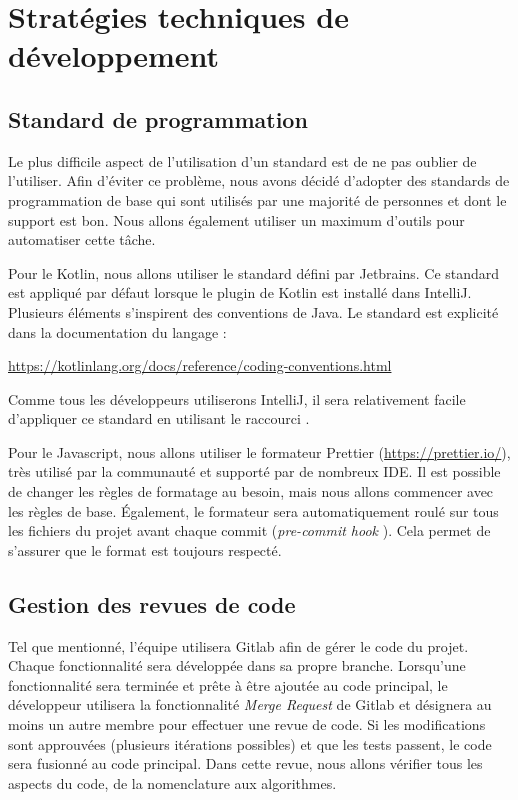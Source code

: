 \section{Stratégies techniques de développement}
	\subsection{Standard de programmation}
	Le plus difficile aspect de l’utilisation d’un standard est de ne pas oublier de l’utiliser. Afin d’éviter ce problème, nous avons décidé d’adopter des standards de programmation de base qui sont utilisés par une majorité de personnes et dont le support est bon. Nous allons également utiliser un maximum d’outils pour automatiser cette tâche.

	Pour le Kotlin, nous allons utiliser le standard défini par Jetbrains. Ce standard est appliqué par défaut lorsque le plugin de Kotlin est installé dans IntelliJ. Plusieurs éléments s’inspirent des conventions de Java. Le standard est explicité dans la documentation du langage :
	
	{\centering
	\url{https://kotlinlang.org/docs/reference/coding-conventions.html}
	\par}
	\noindent Comme tous les développeurs utiliserons IntelliJ, il sera relativement facile d’appliquer ce standard en utilisant le raccourci .

	Pour le Javascript, nous allons utiliser le formateur Prettier (\url{https://prettier.io/}), très utilisé par la communauté et supporté par de nombreux IDE. Il est possible de changer les règles de formatage au besoin, mais nous allons commencer avec les règles de base. Également, le formateur sera automatiquement roulé sur tous les fichiers du projet avant chaque commit (\og \emph{pre-commit hook} \fg{}). Cela permet de s’assurer que le format est toujours respecté. 
	\subsection{Gestion des revues de code}
	Tel que mentionné, l’équipe utilisera Gitlab afin de gérer le code du projet. Chaque fonctionnalité sera développée dans sa propre branche. Lorsqu’une fonctionnalité sera terminée et prête à être ajoutée au code principal, le développeur utilisera la fonctionnalité \og \emph{Merge Request} \fg{} de Gitlab et désignera au moins un autre membre pour effectuer une revue de code. Si les modifications sont approuvées (plusieurs itérations possibles) et que les tests passent, le code sera fusionné au code principal. Dans cette revue, nous allons vérifier tous les aspects du code, de la nomenclature aux algorithmes. 

